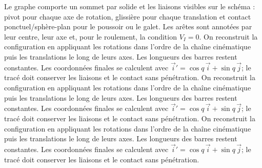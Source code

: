 \begin{corrigebox}
Le graphe comporte un sommet par solide et les
                    liaisons visibles sur le schéma : pivot pour chaque axe de rotation,
                    glissière pour chaque translation et contact ponctuel/sphère-plan pour
                    le poussoir ou le galet. Les arêtes sont annotées par leur centre,
                    leur axe et, pour le roulement, la condition $V_I=0$.
On reconstruit la configuration en appliquant les
                rotations dans l'ordre de la chaîne cinématique puis les translations le
                long de leurs axes. Les longueurs des barres restent constantes. Les
                coordonnées finales se calculent avec
                $\vec i'=\cos q\,\vec i+\sin q\,\vec j$; le tracé doit conserver les
                liaisons et le contact sans pénétration.
On reconstruit la configuration en appliquant les
                rotations dans l'ordre de la chaîne cinématique puis les translations le
                long de leurs axes. Les longueurs des barres restent constantes. Les
                coordonnées finales se calculent avec
                $\vec i'=\cos q\,\vec i+\sin q\,\vec j$; le tracé doit conserver les
                liaisons et le contact sans pénétration.
On reconstruit la configuration en appliquant les
                rotations dans l'ordre de la chaîne cinématique puis les translations le
                long de leurs axes. Les longueurs des barres restent constantes. Les
                coordonnées finales se calculent avec
                $\vec i'=\cos q\,\vec i+\sin q\,\vec j$; le tracé doit conserver les
                liaisons et le contact sans pénétration.
\end{corrigebox}
